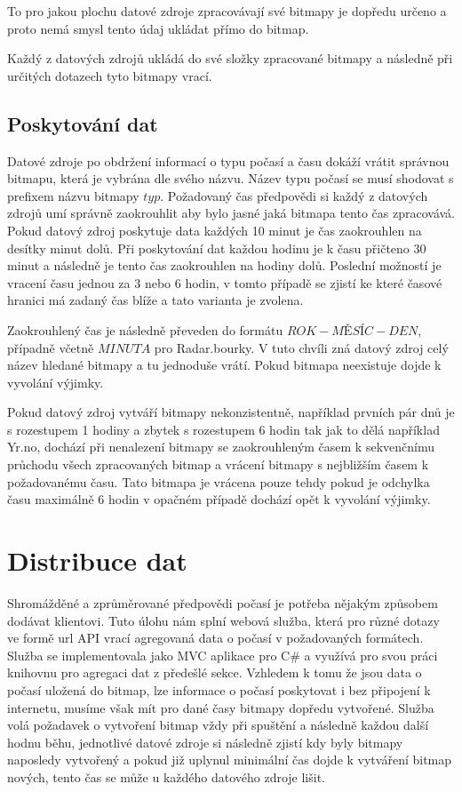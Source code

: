 \documentclass[czech,bachelor,dept460,male,csharp,cpdeclaration]{diploma}
\begin{document}
	To pro jakou plochu datové zdroje zpracovávají své bitmapy je dopředu určeno a proto nemá smysl tento údaj ukládat přímo do bitmap.
	
	Každý z datových zdrojů ukládá do své složky zpracované bitmapy a následně při určitých dotazech tyto bitmapy vrací. 
	
	\section{Poskytování dat}
	
	Datové zdroje po obdržení informací o typu počasí a času dokáží vrátit správnou bitmapu, která je vybrána dle svého názvu. Název typu počasí se musí shodovat s prefixem názvu bitmapy $typ$. Požadovaný čas předpovědi si každý z datových zdrojů umí správně zaokrouhlit aby bylo jasné jaká bitmapa tento čas zpracovává. Pokud datový zdroj poskytuje data každých 10 minut je čas zaokrouhlen na desítky minut dolů. Při poskytování dat každou hodinu je k času přičteno 30 minut a následně je tento čas zaokrouhlen na hodiny dolů. Poslední možností je vracení času jednou za 3 nebo 6 hodin, v tomto případě se zjistí ke které časové hranici má zadaný čas blíže a tato varianta je zvolena.
	
	Zaokrouhlený čas je následně převeden do formátu $ROK-MĚSÍC-DEN$, případně včetně $MINUTA$ pro Radar.bourky. V tuto chvíli zná datový zdroj celý název hledané bitmapy a tu jednoduše vrátí. Pokud bitmapa neexistuje dojde k vyvolání výjimky.
	
	Pokud datový zdroj vytváří bitmapy nekonzistentně, například prvních pár dnů je s rozestupem 1 hodiny a zbytek s rozestupem 6 hodin tak jak to dělá například Yr.no, dochází při nenalezení bitmapy se zaokrouhleným časem k sekvenčnímu průchodu všech zpracovaných bitmap a vrácení bitmapy s nejbližším časem k požadovanému času. Tato bitmapa je vrácena pouze tehdy pokud je odchylka času maximálně 6 hodin v opačném případě dochází opět k vyvolání výjimky.
	
	\chapter{Distribuce dat}
	
	Shromážděné a zprůměrované předpovědi počasí je potřeba nějakým způsobem dodávat klientovi. Tuto úlohu nám splní webová služba, která pro různé dotazy ve formě url API vrací agregovaná data o počasí v požadovaných formátech. Služba se implementovala jako MVC aplikace pro C\# a využívá pro svou práci knihovnu pro agregaci dat z předešlé sekce. Vzhledem k tomu že jsou data o počasí uložená do bitmap, lze informace o počasí poskytovat i bez připojení k internetu, musíme však mít pro dané časy bitmapy dopředu vytvořené. Služba volá požadavek o vytvoření bitmap vždy při spuštění a následně každou další hodnu běhu, jednotlivé datové zdroje si následně zjistí kdy byly bitmapy naposledy vytvořený a pokud již uplynul minimální čas dojde k vytváření bitmap nových, tento čas se může u každého datového zdroje lišit.
	
\end{document}
